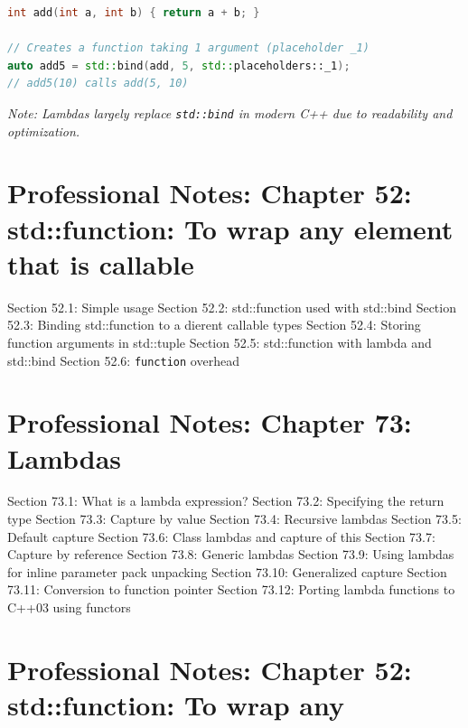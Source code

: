 \begin{lstlisting}[language={C++}]
int add(int a, int b) { return a + b; }

// Creates a function taking 1 argument (placeholder _1)
auto add5 = std::bind(add, 5, std::placeholders::_1); 
// add5(10) calls add(5, 10)
\end{lstlisting}

\emph{Note: Lambdas largely replace \passthrough{\lstinline!std::bind!}
in modern C++ due to readability and optimization.}

\hypertarget{professional-notes-chapter-52-stdfunction-to-wrap-any-element-that-is-callable}{%
\chapter{Professional Notes: Chapter 52: std::function: To wrap any
element that is
callable}\label{professional-notes-chapter-52-stdfunction-to-wrap-any-element-that-is-callable}}

Section 52.1: Simple usage Section 52.2: std::function used with
std::bind Section 52.3: Binding std::function to a dierent callable
types Section 52.4: Storing function arguments in std::tuple Section
52.5: std::function with lambda and std::bind Section 52.6:
\passthrough{\lstinline!function!} overhead

\hypertarget{professional-notes-chapter-73-lambdas}{%
\chapter{Professional Notes: Chapter 73:
Lambdas}\label{professional-notes-chapter-73-lambdas}}

Section 73.1: What is a lambda expression? Section 73.2: Specifying the
return type Section 73.3: Capture by value Section 73.4: Recursive
lambdas Section 73.5: Default capture Section 73.6: Class lambdas and
capture of this Section 73.7: Capture by reference Section 73.8: Generic
lambdas Section 73.9: Using lambdas for inline parameter pack unpacking
Section 73.10: Generalized capture Section 73.11: Conversion to function
pointer Section 73.12: Porting lambda functions to C++03 using functors

\hypertarget{professional-notes-chapter-52-stdfunction-to-wrap-any}{%
\chapter{Professional Notes: Chapter 52: std::function: To wrap
any}\label{professional-notes-chapter-52-stdfunction-to-wrap-any}}

